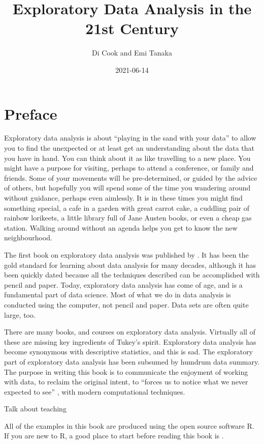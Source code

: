 \documentclass[
]{book}
\title{Exploratory Data Analysis in the 21st Century}
\author{Di Cook and Emi Tanaka}
\date{2021-06-14}
\begin{document}
\maketitle

{
\setcounter{tocdepth}{1}
\tableofcontents
}
\hypertarget{preface}{%
\chapter{Preface}\label{preface}}

Exploratory data analysis is about ``playing in the sand with your data'' to allow you to find the unexpected or at least get an understanding about the data that you have in hand. You can think about it as like travelling to a new place. You might have a purpose for visiting, perhaps to attend a conference, or family and friends. Some of your movements will be pre-determined, or guided by the advice of others, but hopefully you will spend some of the time you wandering around without guidance, perhaps even aimlessly. It is in these times you might find something special, a cafe in a garden with great carrot cake, a cuddling pair of rainbow lorikeets, a little library full of Jane Austen books, or even a cheap gas station. Walking around without an agenda helps you get to know the new neighbourhood.

The first book on exploratory data analysis was published by \citet{tukey77}. It has been the gold standard for learning about data analysis for many decades, although it has been quickly dated because all the techniques described can be accomplished with pencil and paper. Today, exploratory data analysis has come of age, and is a fundamental part of data science. Most of what we do in data analysis is conducted using the computer, not pencil and paper. Data sets are often quite large, too.

There are many books, and courses on exploratory data analysis. Virtually all of these are missing key ingredients of Tukey's spirit. Exploratory data analysis has become synonymous with descriptive statistics, and this is sad. The exploratory part of exploratory data analysis has been subsumed by humdrum data summary. The purpose in writing this book is to communicate the enjoyment of working with data, to reclaim the original intent, to ``forces us to notice what we never expected to see'' \citep{tukey77}, with modern computational techniques.

Talk about teaching

All of the examples in this book are produced using the open source software R. If you are new to R, a good place to start before reading this book is \citet{r4ds}.
\end{document}
